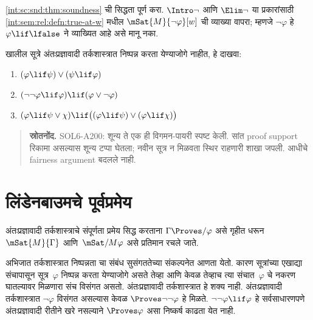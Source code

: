 \begin{prob}
  \ref{int:sc:snd:thm:soundness} ची सिद्धता
  पूर्ण करा. $\Intro\lnot$ आणि $\Elim\lnot$
  या प्रकारांसाठी
  \ref{int:sem:rel:defn:true-at-w} मधील
  $\mSat{M}{\lnot \varphi}[w]$ ची व्याख्या वापरा;
  म्हणजे $\lnot \varphi$ हे
  $\varphi \lif \lfalse$ ने व्याख्यित आहे
  असे मानू नका.
\end{prob}

\begin{prob}
  खालील सूत्रे अंतःप्रज्ञावादी तर्कशास्त्रात
  निष्पन्न करता येण्याजोगे नाहीत, हे दाखवा:
  \begin{enumerate}
    \item $(\varphi \lif \psi) \lor (\psi \lif \varphi)$
    \item $(\lnot\lnot \varphi \lif \varphi) \lif (\varphi \lor \lnot \varphi)$
    \item $(\varphi \lif \psi \lor \chi) \lif \bigl((\varphi \lif \psi)\lor(\varphi \lif \chi)\bigr)$
  \end{enumerate}
\end{prob}






\begin{quote}\small\textbf{स्रोतनोंद.} SOL6-A200: शून्य ते एक ही विगमन-पायरी स्पष्ट केली. सांत proof support रिकामा असल्यास शून्य टप्पा घेतला; नवीन सूत्र न मिळवता स्थिर राहणारी शाखा जपली. आधीचे fairness argument बदलले नाही.\end{quote}






\section{लिंडेनबाउमचे पूर्वप्रमेय}\label{int:sc:lin:sec}

अंतःप्रज्ञावादी तर्कशास्त्राचे संपूर्णता प्रमेय सिद्ध करताना
$\Gamma \Proves/ \varphi$ असे गृहीत धरून
$\mSat{M}{\Gamma}$ आणि~$\mSat/{M}{\varphi}$
असे प्रतिमान रचले जाते.

अभिजात तर्कशास्त्रात निष्पन्नता चा संबंध
सुसंगततेच्या संकल्पनेत आणता येतो. कारण सूत्रांच्या
एखाद्या संचापासून सूत्र~$\varphi$
निष्पन्न करता येण्याजोगे असते तेव्हा आणि केवळ तेव्हाच
त्या संचात~$\varphi$ चे नकरण घातल्यावर मिळणारा
संच विसंगत असतो. अंतःप्रज्ञावादी तर्कशास्त्रात
हे शक्य नाही. अंतःप्रज्ञावादी तर्कशास्त्रात
$\lnot\varphi$ विसंगत असल्यास केवळ
$\Proves \lnot\lnot \varphi$ हे मिळते.
$\lnot\lnot\varphi \lif \varphi$ हे सर्वसाधारणपणे
अंतःप्रज्ञावादी रीतीने खरे नसल्याने
$\Proves \varphi$ असा निष्कर्ष काढता येत नाही.

